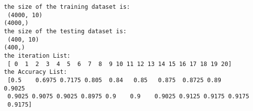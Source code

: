 \documentclass[11pt]{article}
\begin{document}
    \begin{Verbatim}[commandchars=\\\{\}]
the size of the training dataset is:
 (4000, 10)
(4000,)
the size of the testing dataset is:
 (400, 10)
(400,)
the iteration List:
 [ 0  1  2  3  4  5  6  7  8  9 10 11 12 13 14 15 16 17 18 19 20]
the Accuracy List:
 [0.5    0.6975 0.7175 0.805  0.84   0.85   0.875  0.8725 0.89   0.9025
 0.9025 0.9075 0.9025 0.8975 0.9    0.9    0.9025 0.9125 0.9175 0.9175
 0.9175]

    \end{Verbatim}

    \begin{center}
    \end{center}
    { \hspace*{\fill} \\}
    

    
    
    
    
\end{document}
